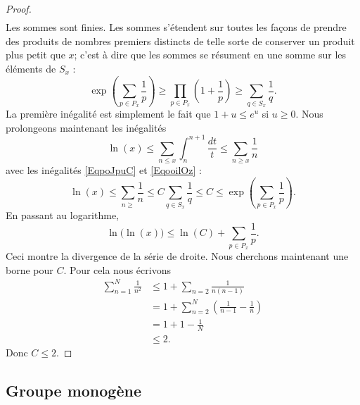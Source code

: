 \begin{proof}
\begin{subequations}
\begin{align}
        \end{align}
    \end{subequations}
    Les sommes sont finies. Les sommes s'étendent sur toutes les façons de prendre des produits de nombres premiers distincts de telle sorte de conserver un produit plus petit que \( x\); c'est à dire que les sommes se résument en une somme sur les éléments de \( S_x\) :
    \begin{equation}        \label{EqooilOz}
        \exp\left( \sum_{p\in P_x}\frac{1}{ p } \right)\geq\prod_{p\in P_x}\left( 1+\frac{1}{ p } \right)\geq \sum_{q\in S_x}\frac{1}{ q }.
    \end{equation}
    La première inégalité est simplement le fait que \( 1+u\leq e^u\) si \( u\geq 0\). Nous prolongeons maintenant les inégalités
    \begin{equation}
        \ln(x)\leq \sum_{n\leq x}\int_{n}^{n+1}\frac{dt}{ t }\leq \sum_{n\geq x}\frac{1}{ n }
    \end{equation}
    avec les inégalités \eqref{EqpoJpuC} et \eqref{EqooilOz} :
    \begin{equation}
        \ln(x)\leq \sum_{n\geq}\frac{1}{ n }\leq C\sum_{q\in S_x}\frac{1}{ q }\leq C\leq \exp\left( \sum_{p\in P_x}\frac{1}{ p } \right).
    \end{equation}
    En passant au logarithme,
    \begin{equation}
        \ln\big( \ln(x) \big)\leq\ln(C)+\sum_{p\in P_x}\frac{1}{ p }.
    \end{equation}
    Ceci montre la divergence de la série de droite. Nous cherchons maintenant une borne pour \( C\). Pour cela nous écrivons
    \begin{subequations}
        \begin{align}
            \sum_{n=1}^N\frac{1}{ n^2 }&\leq 1+\sum_{n=2}\frac{1}{ n(n-1) }\\
            &=1+\sum_{n=2}^N\left( \frac{1}{ n-1 }-\frac{1}{ n } \right)\\
            &=1+1-\frac{1}{ N }\\
            &\leq 2.
        \end{align}
    \end{subequations}
    Donc \( C\leq 2\).
\end{proof}

\subsection{Groupe monogène}

